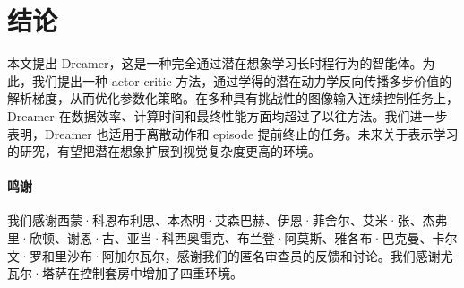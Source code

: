 \section{结论}

本文提出 Dreamer，这是一种完全通过潜在想象学习长时程行为的智能体。为此，我们提出一种 actor-critic 方法，通过学得的潜在动力学反向传播多步价值的解析梯度，从而优化参数化策略。在多种具有挑战性的图像输入连续控制任务上，Dreamer 在数据效率、计算时间和最终性能方面均超过了以往方法。我们进一步表明，Dreamer 也适用于离散动作和 episode 提前终止的任务。未来关于表示学习的研究，有望把潜在想象扩展到视觉复杂度更高的环境。

\paragraph{鸣谢}

我们感谢西蒙·科恩布利思、本杰明·艾森巴赫、伊恩·菲舍尔、艾米·张、杰弗里·欣顿、谢恩·古、亚当·科西奥雷克、布兰登·阿莫斯、雅各布·巴克曼、卡尔文·罗和里沙布·阿加尔瓦尔，感谢我们的匿名审查员的反馈和讨论。我们感谢尤瓦尔·塔萨在控制套房中增加了四重环境。
